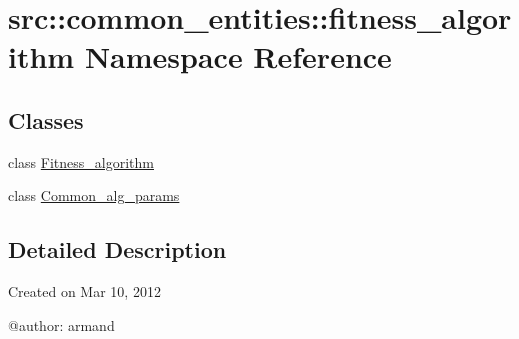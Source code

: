 \hypertarget{namespacesrc_1_1common__entities_1_1fitness__algorithm}{
\section{src::common\_\-entities::fitness\_\-algorithm Namespace Reference}
\label{namespacesrc_1_1common__entities_1_1fitness__algorithm}
}
\subsection*{Classes}
\begin{DoxyCompactItemize}
\item 
class \hyperlink{classsrc_1_1common__entities_1_1fitness__algorithm_1_1Fitness__algorithm}{Fitness\_\-algorithm}
\item 
class \hyperlink{classsrc_1_1common__entities_1_1fitness__algorithm_1_1Common__alg__params}{Common\_\-alg\_\-params}
\end{DoxyCompactItemize}


\subsection{Detailed Description}
\begin{DoxyVerb}
Created on Mar 10, 2012

@author: armand
\end{DoxyVerb}
 